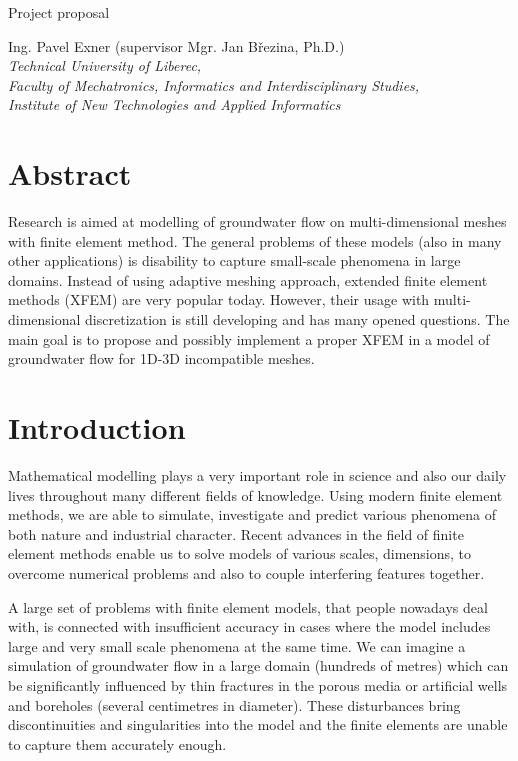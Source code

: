\documentclass{sna}
\begin{document}
     {Project proposal}
     {}

Ing. Pavel Exner (supervisor Mgr. Jan B{\v r}ezina, Ph.D.)\\
\emph{Technical University of Liberec, \\
Faculty of Mechatronics, Informatics and Interdisciplinary Studies, \\
Institute of New Technologies and Applied Informatics}


\section{Abstract}
Research is aimed at modelling of groundwater flow on multi-dimensional meshes with finite element method. 
The general problems of these models (also in many other applications) is disability to capture small-scale 
phenomena in large domains. Instead of using adaptive meshing approach, extended finite element methods (XFEM) 
are very popular today. However, their usage with multi-dimensional discretization is still developing 
and has many opened questions. The main goal is to propose and possibly implement a proper XFEM in 
a model of groundwater flow for 1D-3D incompatible meshes.

\section{Introduction}
Mathematical modelling plays a very important role in science and also our daily lives throughout many different
fields of knowledge. Using modern finite element methods, we are able to simulate, investigate and predict
various phenomena of both nature and industrial character. Recent advances in the field of finite element methods
enable us to solve models of various scales, dimensions, to overcome numerical problems and also 
to couple interfering features together.

A large set of problems with finite element models, that people nowadays deal with, is connected with 
insufficient accuracy in cases where the model includes large and very small scale phenomena at the same time.
We can imagine a simulation of groundwater flow in a large domain (hundreds of metres) which can be significantly
influenced by thin fractures in the porous media or artificial wells and boreholes (several centimetres in diameter).
These disturbances bring discontinuities and singularities into the model and the finite elements are
unable to capture them accurately enough.
\end{document}
